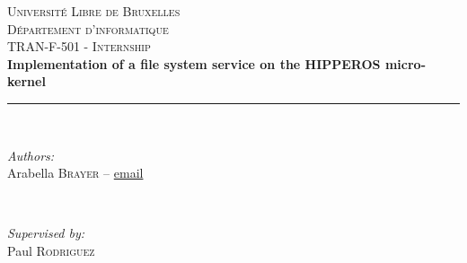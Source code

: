 \documentclass[12pt]{article}
\begin{document}
\begin{titlepage}

\def\EMAILArabella{Arabella.Brayer@ulb.ac.be}

\newcommand{\imagepath}{../img}
\newcommand{\university}{Université Libre de Bruxelles}
\newcommand{\faculty}{Département d'informatique}
\newcommand{\course}{TRAN-F-501 - Internship}
\newcommand{\authors}{\bfseries{Arabella \textsc{Brayer}} -- \emailArabella}
\newcommand{\supervisor}{Paul \textsc{Rodriguez}}
\newcommand{\HRule}{\rule{\linewidth}{0.5mm}} %
\newcommand{\emailArabella}{\href{mailto:\EMAILArabella?subject=[TRAN-F-501 - Internship]}{\color{\EMAILArabella}\path|\EMAILArabella|}}
\center %
 

\textsc{\LARGE \university}\\[1.5cm] %
\textsc{\Large \faculty}\\[0.5cm] %
\textsc{\large \course}\\[0.5cm] %

{ \huge \bfseries Implementation of a file system service on the HIPPEROS micro-kernel}\\[0.4cm] %
\HRule \\[1.5cm]
 
\begin{minipage}{0.4\textwidth}
\begin{flushleft} \large
\emph{Authors:}\\
Arabella \textsc{Brayer} -- \href{mailto:Arabella.Brayer@ulb.ac.be?subject=[TRAN-F-501 - Internship]}{email}
\end{flushleft}
\end{minipage}
~
\begin{minipage}{0.4\textwidth}
\begin{flushright} \large
\emph{Supervised by:} \\
\supervisor %
\end{flushright}
\end{minipage}\\[2cm]



\end{titlepage}
\end{document}
